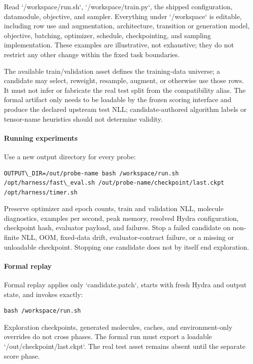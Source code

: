 Read `/workspace/run.sh`, `/workspace/train.py`, the shipped configuration, datamodule, objective, and sampler. Everything under `/workspace` is editable, including row use and augmentation, architecture, transition or generation model, objective, batching, optimizer, schedule, checkpointing, and sampling implementation. These examples are illustrative, not exhaustive; they do not restrict any other change within the fixed task boundaries.

The available train/validation asset defines the training-data universe; a candidate may select, reweight, resample, augment, or otherwise use those rows. It must not infer or fabricate the real test split from the compatibility alias. The formal artifact only needs to be loadable by the frozen scoring interface and produce the declared upstream test NLL; candidate-authored algorithm labels or tensor-name heuristics should not determine validity.

\paragraph{Running experiments}

Use a new output directory for every probe:

\begin{verbatim}
OUTPUT\_DIR=/out/probe-name bash /workspace/run.sh
/opt/harness/fast\_eval.sh /out/probe-name/checkpoint/last.ckpt
/opt/harness/timer.sh
\end{verbatim}

Preserve optimizer and epoch counts, train and validation NLL, molecule diagnostics, examples per second, peak memory, resolved Hydra configuration, checkpoint hash, evaluator payload, and failures. Stop a failed candidate on non-finite NLL, OOM, fixed-data drift, evaluator-contract failure, or a missing or unloadable checkpoint. Stopping one candidate does not by itself end exploration.

\paragraph{Formal replay}

Formal replay applies only `candidate.patch`, starts with fresh Hydra and output state, and invokes exactly:

\begin{verbatim}
bash /workspace/run.sh
\end{verbatim}

Exploration checkpoints, generated molecules, caches, and environment-only overrides do not cross phases. The formal run must export a loadable `/out/checkpoint/last.ckpt`. The real test asset remains absent until the separate score phase.

